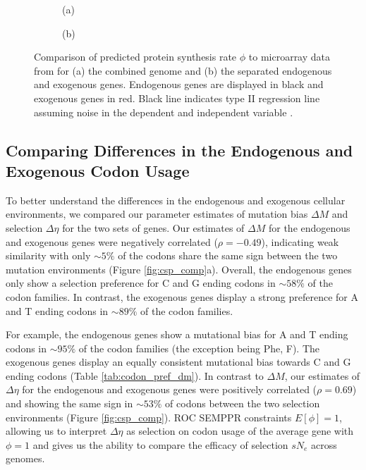 \documentclass{bmcart}
\def\texttt{[image: ]}
\newcommand{\ROC}{ROC SEMPPR\xspace}
\newcommand{\DM}{\ensuremath{{\Delta M}}\xspace}
\newcommand{\DE}{\ensuremath{{\Delta \eta}}\xspace}
\newcommand{\Ne}{\ensuremath{N_e}\xspace}
\begin{document}
\begin{figure}
    \centering
    \begin{subfigure}
        \centering
        (a) %
    \end{subfigure}
    \begin{subfigure}
        \centering
        (b) %
    \end{subfigure}
    \caption{Comparison of predicted protein synthesis rate $\phi$ to microarray data from \citet{tsankov2010} for (a) the combined genome and (b) the separated endogenous and exogenous genes. 
    Endogenous genes are displayed in black and exogenous genes in red. 
    Black line indicates type II regression line assuming noise in the dependent and independent variable \citep{SokalAndRohlf1981}.}
    \label{fig:phi_corr_two_cond}
\end{figure}


\subsection*{Comparing Differences in the Endogenous and Exogenous Codon Usage}
To better understand the differences in the endogenous and exogenous cellular environments, we compared our parameter estimates of mutation bias \DM and selection \DE for the two sets of genes.
Our estimates of \DM for the endogenous and exogenous genes were negatively correlated ($\rho = -0.49$),  indicating weak similarity with only $\sim5\%$ of the codons share the same sign between the two mutation environments (Figure \ref{fig:csp_comp}a).
Overall, the endogenous genes only show a selection preference for C and G ending codons in $\sim58\%$ of the codon families.
In contrast, the exogenous genes display a strong preference for A and T ending codons in $\sim89\%$ of the codon families.

For example, the endogenous genes show a mutational bias for A and T ending codons in $\sim95\%$ of the codon families (the exception being Phe, F).
The exogenous genes display an equally consistent mutational bias towards C and G ending codons (Table \ref{tab:codon_pref_dm}).
In contrast to \DM, our estimates of \DE for the endogenous and exogenous genes were positively correlated ($\rho = 0.69$) and showing the same sign in $\sim53\%$ of codons between the two selection environments (Figure \ref{fig:csp_comp}).
\ROC constraints $E[\phi] = 1$, allowing us to interpret \DE as selection on codon usage of the average gene with $\phi = 1$ and gives us the ability to compare the efficacy of selection $s\Ne$  across genomes.
\end{document}
